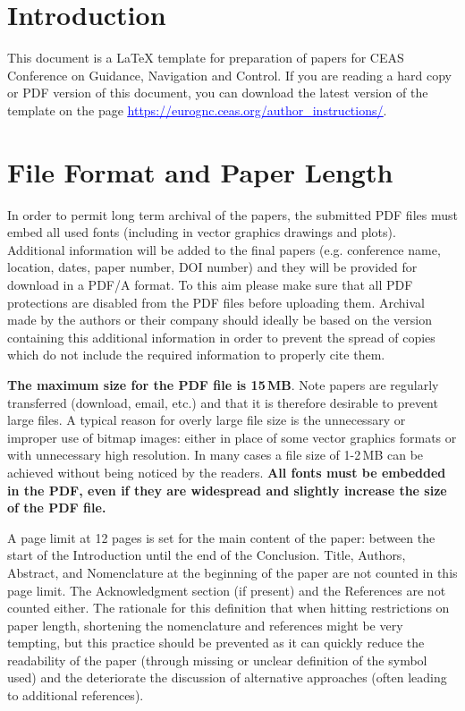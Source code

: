 \documentclass{CEAS_EuroGNC_2024}
\begin{document}
\section{Introduction}
This document is a \LaTeX{} template for preparation of papers for CEAS Conference on Guidance, Navigation and Control. If you are reading a hard copy or PDF version of this document, you can download the latest version of the template on the page \href{https://eurognc.ceas.org/author_instructions/}{\textcolor{blue}{\underline{https://eurognc.ceas.org/author\_instructions/}}}.

\newpage
\section{File Format and Paper Length}
In order to permit long term archival of the papers, the submitted PDF files must embed all used fonts (including in vector graphics drawings and plots). Additional information will be added to the final papers (e.g. conference name, location, dates, paper number, DOI number) and they will be provided for download in a PDF/A format. To this aim please make sure that all PDF protections are disabled from the PDF files before uploading them. Archival made by the authors or their company should ideally be based on the version containing this additional information in order to prevent the spread of copies which do not include the required information to properly cite them.

\textbf{The maximum size for the PDF file is 15\,MB}. Note papers are regularly transferred (download, email, etc.) and that it is therefore desirable to prevent large files. A typical reason for overly large file size is the unnecessary or improper use of bitmap images: either in place of some vector graphics formats or with unnecessary high resolution. In many cases a file size of 1-2\,MB can be achieved without being noticed by the readers. \textbf{All fonts must be embedded in the PDF, even if they are widespread and slightly increase the size of the PDF file.}

A page limit at 12 pages is set for the main content of the paper: between the start of the Introduction until the end of the Conclusion. Title, Authors, Abstract, and Nomenclature at the beginning of the paper are not counted in this page limit. The Acknowledgment section (if present) and the References are not counted either. The rationale for this definition that when hitting restrictions on paper length, shortening the nomenclature and references might be very tempting, but this practice should be prevented as it can quickly reduce the readability of the paper (through missing or unclear definition of the symbol used) and the deteriorate the discussion of alternative approaches (often leading to additional references).
\end{document}

